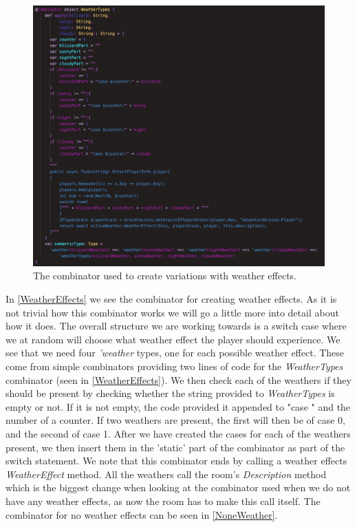 \begin{figure}[H]
	\centering
	\includegraphics[width=\linewidth]{Materials/Decomposition/Room/WeatherEffects}
	\caption{The combinator used to create variations with weather effects.}
	\label{WeatherEffects}
\end{figure}
In \autoref{WeatherEffects} we see the combinator for creating weather effects. As it is not trivial how this combinator works we will go a little more into detail about how it does. The overall structure we are working towards is a switch case where we at random will choose what weather effect the player should experience. We see that we need four \textit{'weather} types, one for each possible weather effect. These come from simple combinators providing two lines of code for the \textit{WeatherTypes} combinator (seen in \autoref{WeatherEffects}). We then check each of the weathers if they should be present by checking whether the string provided to \textit{WeatherTypes} is empty or not. If it is not empty, the code provided it appended to "case " and the number of a counter. If two weathers are present, the first will then be of case 0, and the second of case 1. After we have created the cases for each of the weathers present, we then insert them in the 'static' part of the combinator as part of the switch statement. We note that this combinator ends by calling a weather effects \textit{WeatherEffect} method. All the weathers call the room's \textit{Description} method which is the biggest change when looking at the combinator used when we do not have any weather effects, as now the room has to make this call itself. The combinator for no weather effects can be seen in \autoref{NoneWeather}.

